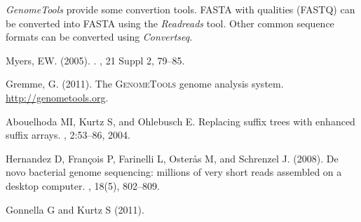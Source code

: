 \documentclass[12pt,titlepage]{article}
\newcommand{\GenomeTools}{\textit{GenomeTools}\xspace}
\newcommand{\Gtconvertseq}{\textit{Convertseq}\xspace}
\newcommand{\Gtreadreads}{\textit{Readreads}\xspace}
\begin{document}
\GenomeTools provide some convertion tools.
FASTA with qualities (FASTQ) can be converted into FASTA using the \Gtreadreads
tool. Other common sequence formats can be converted using \Gtconvertseq.

\begin{thebibliography}{1}

Myers, EW. (2005).
.
, {21 Suppl 2}, 79--85.

Gremme, G. (2011).
\newblock The \textsc{GenomeTools} genome analysis system.
  \url{http://genometools.org}.

Abouelhoda MI, Kurtz S, and Ohlebusch E.
\newblock Replacing suffix trees with enhanced suffix arrays.
, 2:53--86, 2004.

Hernandez D, François P, Farinelli L, Osterås M, and Schrenzel J.
  (2008).
\newblock De novo bacterial genome sequencing: millions of very short reads
  assembled on a desktop computer.
, {18}(5), 802--809.

Gonnella G and Kurtz S (2011).

\end{thebibliography}
\end{document}
